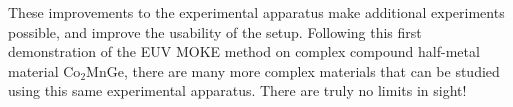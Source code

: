 These improvements to the experimental apparatus make additional experiments possible, and improve the usability of the setup. Following this first demonstration of the EUV MOKE method on complex compound half-metal material Co$_2$MnGe, there are many more complex materials that can be studied using this same experimental apparatus. There are truly no limits in sight!